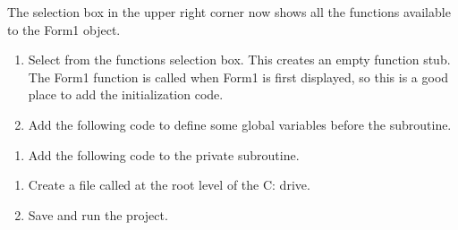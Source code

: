 \documentclass[letterpaper,12pt,english,openany,oneside]{sphinxmanual}
\begin{document}
The selection box in the upper right corner now shows all the functions available to the Form1 object.
\begin{enumerate}
%
\item {} 
Select  from the functions selection box. This creates an empty function stub. The Form1  function is called when Form1 is first displayed, so this is a good place to add the initialization code.

\item {} 
Add the following code to define some global variables before the subroutine.

\end{enumerate}

\begin{sphinxVerbatim}[commandchars=\\\{\}]
   
   
   
\end{sphinxVerbatim}
\begin{enumerate}
%
\item {} 
Add the following code to the private  subroutine.

\end{enumerate}

\begin{sphinxVerbatim}[commandchars=\\\{\}]
  
  
  
      
     
 
\end{sphinxVerbatim}
\begin{enumerate}
%
\item {} 
Create a file called  at the root level of the C: drive.

\item {} 
Save and run the project.

\end{enumerate}
\end{document}
